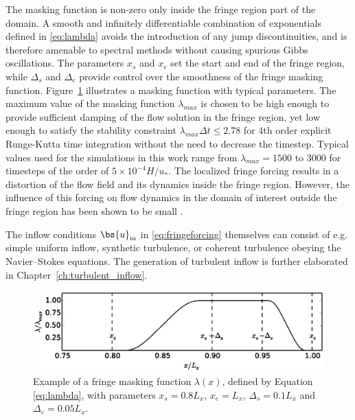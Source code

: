 The masking function is non-zero only inside the fringe region part of the domain. A smooth and infinitely differentiable combination of exponentials defined in \eqref{eq:lambda} avoids the introduction of any jump discontinuities, and is therefore amenable to spectral methods without causing spurious Gibbs oscillations. The parameters $x_s$ and $x_e$ set the start and end of the fringe region, while $\Delta_s$ and $\Delta_e$ provide control over the smoothness of the fringe masking function. Figure~\ref{fig:lambda} illustrates a masking function with typical parameters. The maximum value of the masking function $\lambda_{max}$ is chosen to be high enough to provide sufficient damping of the flow solution in the fringe region, yet low enough to satisfy the stability constraint $\lambda_{max}\Delta t \le 2.78$ for 4th order explicit Runge-Kutta time integration \citep{schlatter2005windowing} without the need to decrease the timestep. Typical values used for the simulations in this work range from $\lambda_{max} = 1 500$ to $3 000$ for timesteps of the order of $5 \times 10^{-4} H/u_*$. The localized fringe forcing results in a distortion of the flow field and its dynamics inside the fringe region. However, the influence of this forcing on flow dynamics in the domain of interest outside the fringe region has been shown to be small \citep{nordstrom1999fringe}.

The inflow conditions $\bs{u}_{\text{in}}$ in \eqref{eq:fringeforcing} themselves can consist of e.g. simple uniform inflow, synthetic turbulence, or coherent turbulence obeying the Navier--Stokes equations. The generation of turbulent inflow is further elaborated in Chapter~\ref{ch:turbulent_inflow}. 

\begin{figure}[t]
	\centering
	\includegraphics[width = \textwidth,trim= 0cm 4.4cm 0cm 5cm,clip]{chapters/methodology/lambda_fringefunction.eps}
	\caption[Example of a fringe masking function $\lambda(x)$.]{Example of a fringe masking function $\lambda(x)$, defined by Equation \eqref{eq:lambda}, with parameters $x_{s} = 0.8L_x$, $x_{e} = L_x$, $\Delta_{s} = 0.1L_x$ and $\Delta_{e} = 0.05L_x$.}
	\label{fig:lambda}
\end{figure}	



